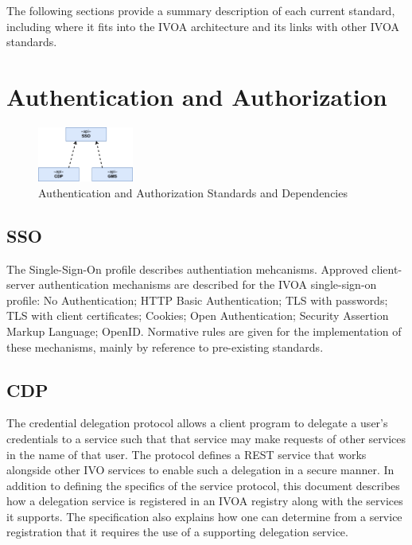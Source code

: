 \documentclass[11pt,a4paper]{ivoa}
\begin{document}
The following sections provide a summary description of each current standard, including 
where it fits into the IVOA architecture and its links with other IVOA standards.

\section{Authentication and Authorization}

\begin{figure}[h]
\centering
\includegraphics[width=0.28\textwidth]{ivoa-arch-auth.png}
\caption{Authentication and Authorization Standards and Dependencies}
\label{fig:authdeps}
\end{figure}

\subsection{SSO}

The Single-Sign-On profile describes authentiation mehcanisms. Approved client-server 
authentication mechanisms are described for the IVOA single-sign-on profile: No Authentication; 
HTTP Basic Authentication; TLS with passwords; TLS with client certificates; Cookies; Open 
Authentication; Security Assertion Markup Language; OpenID. Normative rules are given for 
the implementation of these mechanisms, mainly by reference to pre-existing standards.

\subsection{CDP}

The credential delegation protocol allows a client program to delegate a user's credentials 
to a service such that that service may make requests of other services in the name of that 
user. The protocol defines a REST service that works alongside other IVO services to enable 
such a delegation in a secure manner. In addition to defining the specifics of the service 
protocol, this document describes how a delegation service is registered in an IVOA registry 
along with the services it supports. The specification also explains how one can determine 
from a service registration that it requires the use of a supporting delegation service. 
\end{document}
